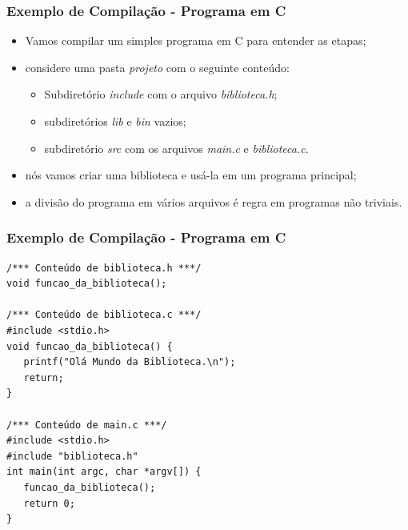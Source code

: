 \documentclass[table]{beamer}
\begin{document}
\begin{frame}
   \frametitle{Exemplo de Compilação - Programa em C}
   \begin{itemize}
      \item Vamos compilar um simples programa em C para entender as etapas;
      \item considere uma pasta \textit{projeto} com o seguinte conteúdo:
      \begin{itemize}
         \item Subdiretório \textit{include} com o arquivo \textit{biblioteca.h};
	 \item subdiretórios \textit{lib} e \textit{bin} vazios;
	 \item subdiretório \textit{src} com os arquivos \textit{main.c} e \textit{biblioteca.c}.
      \end{itemize}
      \item nós vamos criar uma biblioteca e usá-la em um programa principal;
      \item a divisão do programa em vários arquivos é regra em programas não triviais.
   \end{itemize}
\end{frame}

\begin{frame}[fragile]
   \frametitle{Exemplo de Compilação - Programa em C}
   \begin{verbatim}
/*** Conteúdo de biblioteca.h ***/
void funcao_da_biblioteca();

/*** Conteúdo de biblioteca.c ***/
#include <stdio.h>
void funcao_da_biblioteca() {
   printf("Olá Mundo da Biblioteca.\n");
   return;
}

/*** Conteúdo de main.c ***/
#include <stdio.h>
#include "biblioteca.h"
int main(int argc, char *argv[]) {
   funcao_da_biblioteca();
   return 0;
}
   \end{verbatim}
\end{frame}
\end{document}
